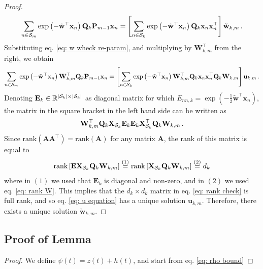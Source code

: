 \documentclass[twoside,11pt,english]{article}
\begin{document}
{\begin{proof}
\[
\sum_{n\in\mathcal{S}_{m}}\exp\left(-\tilde{\mathbf{w}}^{\top}\mathbf{x}_{n}\right)\mathbf{Q}_{k}\mathbf{P}_{m-1}\mathbf{x}_{n}=\left[\sum_{n\in\mathcal{S}_{k}}\exp\left(-\tilde{\mathbf{w}}^{\top}\mathbf{x}_{n}\right)\mathbf{Q}_{k}\mathbf{x}_{n}\mathbf{x}_{n}^{\top}\right]\check{\mathbf{w}}_{k,m}\,.
\]
Substituting eq. \ref{eq: w wheck re-param}, and multiplying by $\mathbf{W}_{k,m}^{\top}$
from the right, we obtain
\begin{equation}
\sum_{n\in\mathcal{S}_{m}}\exp\left(-\tilde{\mathbf{w}}^{\top}\mathbf{x}_{n}\right)\mathbf{W}_{k,m}^{\top}\mathbf{Q}_{k}\mathbf{P}_{m-1}\mathbf{x}_{n}=\left[\sum_{n\in\mathcal{S}_{k}}\exp\left(-\tilde{\mathbf{w}}^{\top}\mathbf{x}_{n}\right)\mathbf{W}_{k,m}^{\top}\mathbf{Q}_{k}\mathbf{x}_{n}\mathbf{x}_{n}^{\top}\mathbf{Q}_{k}\mathbf{W}_{k,m}\right]\mathbf{u}_{k,m}\,.\label{eq: u equation}
\end{equation}
Denoting $\mathbf{E}_{k}\in\mathbb{R}^{\left|\mathcal{S}_{k}\right|\times\left|\mathcal{S}_{k}\right|}$
as diagonal matrix for which $E_{nn,k}=\exp\left(-\frac{1}{2}\tilde{\mathbf{w}}^{\top}\mathbf{x}_{n}\right)$,
the matrix in the square bracket in the left hand side can be written
as
\begin{equation}
\mathbf{W}_{k,m}^{\top}\mathbf{Q}_{k}\mathbf{X}_{\mathcal{S}_{k}}\mathbf{E}_{k}\mathbf{E}_{k}\mathbf{X}_{\mathcal{S}_{k}}^{\top}\mathbf{Q}_{k}\mathbf{W}_{k,m}\,.\label{eq: rank check}
\end{equation}
Since $\mathrm{rank}\left(\mathbf{A}\mathbf{A}^{\top}\right)=\mathrm{rank}\left(\mathbf{A}\right)$
for any matrix $\mathbf{A}$, the rank of this matrix is equal to
\[
\mathrm{rank}\left[\mathbf{E}\mathbf{X}_{\mathcal{S}_{k}}\mathbf{Q}_{k}\mathbf{W}_{k,m}\right]\overset{\left(1\right)}{=}\mathrm{rank}\left[\mathbf{X}_{\mathcal{S}_{k}}\mathbf{Q}_{k}\mathbf{W}_{k,m}\right]\overset{\left(2\right)}{=}d_{k}
\]
where in $\left(1\right)$ we used that $\mathbf{E}_{k}$ is diagonal
and non-zero, and in $\left(2\right)$ we used eq. \ref{eq: rank W}.
This implies that the $d_{k}\times d_{k}$ matrix in eq. \ref{eq: rank check}
is full rank, and so eq. \ref{eq: u equation} has a unique solution
$\mathbf{u}_{k,m}$. Therefore, there exists a unique solution $\check{\mathbf{w}}_{k,m}$.
\end{proof}

\subsection{Proof of Lemma \label{lem: PhisSum}}

\PhiSum*
\begin{proof}
We define $\psi\left(t\right)=z\left(t\right)+h\left(t\right)$, and
start from eq. \ref{eq: rho bound}


\end{proof}}
\end{document}
